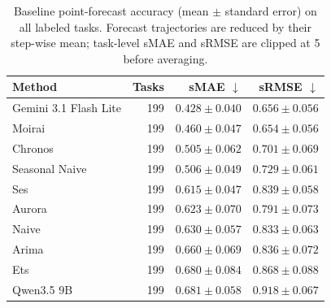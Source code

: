 \begin{table}[t]
  \centering
  \caption{Baseline point-forecast accuracy (mean $\pm$ standard error) on all labeled tasks. Forecast trajectories are reduced by their step-wise mean; task-level sMAE and sRMSE are clipped at 5 before averaging.}
  \label{tab:baseline-point-metrics}
  \begin{tabular}{lrrr}
    \toprule
    Method & Tasks & sMAE $\downarrow$ & sRMSE $\downarrow$ \\
    \midrule
    Gemini 3.1 Flash Lite & 199 & $\mathbf{0.428 \pm 0.040}$ & $0.656 \pm 0.056$ \\
    Moirai & 199 & $0.460 \pm 0.047$ & $\mathbf{0.654 \pm 0.056}$ \\
    Chronos & 199 & $0.505 \pm 0.062$ & $0.701 \pm 0.069$ \\
    Seasonal Naive & 199 & $0.506 \pm 0.049$ & $0.729 \pm 0.061$ \\
    Ses & 199 & $0.615 \pm 0.047$ & $0.839 \pm 0.058$ \\
    Aurora & 199 & $0.623 \pm 0.070$ & $0.791 \pm 0.073$ \\
    Naive & 199 & $0.630 \pm 0.057$ & $0.833 \pm 0.063$ \\
    Arima & 199 & $0.660 \pm 0.069$ & $0.836 \pm 0.072$ \\
    Ets & 199 & $0.680 \pm 0.084$ & $0.868 \pm 0.088$ \\
    Qwen3.5 9B & 199 & $0.681 \pm 0.058$ & $0.918 \pm 0.067$ \\
    \bottomrule
  \end{tabular}
\end{table}
